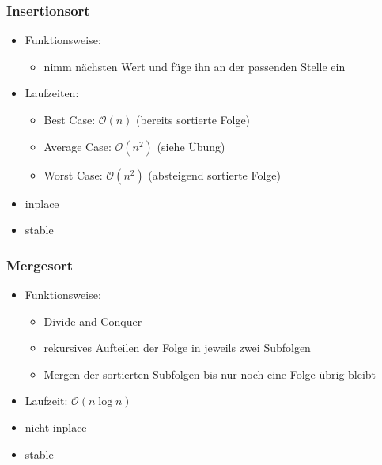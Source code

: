 \begin{frame}
	\frametitle{Insertionsort}
	\begin{itemize}
		\item Funktionsweise:
		\begin{itemize}
			\item nimm nächsten Wert und füge ihn an der passenden Stelle ein
		\end{itemize}
		\item Laufzeiten:
		\begin{itemize}
			\item Best Case: $\mathcal{O}(n)$ (bereits sortierte Folge)
			\item Average Case: $\mathcal{O}(n^2)$ (siehe Übung)
			\item Worst Case: $\mathcal{O}(n^2)$ (absteigend sortierte Folge)
		\end{itemize}
		\item {\color{english}inplace}
		\item {\color{english} stable}
	\end{itemize}
\end{frame}

\begin{frame}
	\frametitle{Mergesort}
	\begin{itemize}
		\item Funktionsweise:
		\begin{itemize}
			\item Divide and Conquer
			\item rekursives Aufteilen der Folge in jeweils zwei Subfolgen
			\item Mergen der sortierten Subfolgen bis nur noch eine Folge übrig bleibt
		\end{itemize}
		\item Laufzeit: $\mathcal{O}(n \log{n})$
		\item {\color{red} nicht inplace}
		\item {\color{english} stable}
	\end{itemize}
\end{frame}

